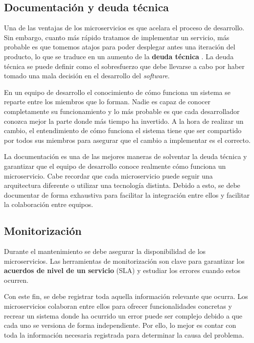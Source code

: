 \documentclass[11pt,spanish,listoffigures]{tfgetsinf}
\begin{document}
\subsection{Documentación y deuda técnica}

Una de las ventajas de los microservicios es que acelara el proceso de desarrollo. Sin embargo, cuanto más rápido tratamos de implementar un servicio, más probable es que tomemos atajos para poder desplegar antes una iteración del producto, lo que se traduce en un aumento de la \textbf{deuda técnica} \cite{FowlerSusan, Garzas}. La deuda técnica se puede definir como el sobresfuerzo que debe llevarse a cabo por  haber tomado una mala decisión en el desarrollo del \textit{software}.

En un equipo de desarrollo el conocimiento de cómo funciona un sistema se reparte entre los miembros que lo forman. Nadie es capaz de conocer completamente su funcionamiento y lo más probable es que cada desarrollador conozca mejor la parte donde más tiempo ha invertido. A la hora de realizar un cambio, el entendimiento de cómo funciona el sistema tiene que ser compartido por todos sus miembros para asegurar que el cambio a implementar es el correcto.

La documentación es una de las mejores maneras de solventar la deuda técnica y garantizar que el equipo de desarrollo conoce realmente cómo funciona un microservicio. Cabe recordar que cada microservicio puede seguir una arquitectura diferente o utilizar una tecnología distinta. Debido a esto, se debe documentar de forma exhaustiva para facilitar la integración entre ellos y facilitar la colaboración entre equipos.

\subsection{Monitorización}

Durante el mantenimiento se debe asegurar la disponibilidad de los microservicios. Las herramientas de monitorización son clave para garantizar los \textbf{acuerdos de nivel de un servicio} (SLA) y estudiar los errores cuando estos ocurren.

Con este fin, se debe registrar toda aquella información relevante que ocurra. Los microservicios colaboran entre ellos para ofrecer funcionalidades concretas y recrear un sistema donde ha ocurrido un error puede ser complejo debido a que cada uno se versiona de forma independiente. Por ello, lo mejor es contar con toda la información necesaria registrada para determinar la causa del problema.
\end{document}
